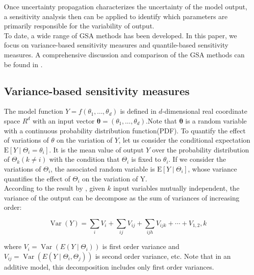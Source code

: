 \noindent
Once uncertainty propagation characterizes the uncertainty of the model output, a sensitivity analysis then can be applied to identify which parameters are primarily responsible for the variability of output. \\

\noindent
To date, a wide range of GSA methods has been developed. In this paper, we focus on variance-based sensitivity measures\citep{sobol1993SensitivityEstimatesNonlinear} and quantile-based sensitivity measures\citep{kucherenko2019QuantileBasedGlobal}. A comprehensive discussion and comparison of the GSA methods can be found in \cite{razavi2021FutureSensitivityAnalysis}.

\subsection{Variance-based sensitivity measures}  \label{sec:3.2}

The model function $Y=f\left(\theta_{1}, \ldots, \theta_{d}\right)$ is defined in $d$-dimensional real coordinate space $R^d$ with an input vector $\boldsymbol{\theta}=(\theta_1, \dots, \theta_{d})$.Note that $\mathbf{\theta}$ is a random variable with a continuous probability distribution function(PDF). To quantify the effect of variations of $\theta$ on the variation of $Y$, let us consider the conditional expectation  $\mathrm{E}\left[Y \mid \Theta_{i}=\theta_{i}\right]$. It is the mean value of output $Y$ over the probability distribution of  $\Theta_k(k \neq i)$ with the condition that $\Theta_i$ is fixed to $\theta_i$. If we consider the variations of $\Theta_i$,  the associated random variable is  $\mathrm{E}\left[Y \mid \Theta_{i}\right]$, whose variance quantifies the effect of $\Theta_i$ on the variation of Y. \\

\noindent
According to the result by \cite{sobol1993SensitivityEstimatesNonlinear}, given $k$ input variables mutually independent, the variance of the output can be decompose as the sum of variances of increasing order:

\begin{equation} \label{eq:7}
\operatorname{Var}(Y)=\sum_{i} V_{i}+\sum_{i j} V_{i j}+\sum_{i j h} V_{i j k}+\cdots+V_{1,2}, k
\end{equation}

\noindent
where $V_i = \operatorname{Var}(E(Y \mid \Theta_i))$ is first order variance and $V_{ij} = \operatorname{Var}(E(Y \mid \Theta_i,\Theta_j))$ is second order variance, etc. Note that in an additive model, this decomposition includes only first order variances. \\


